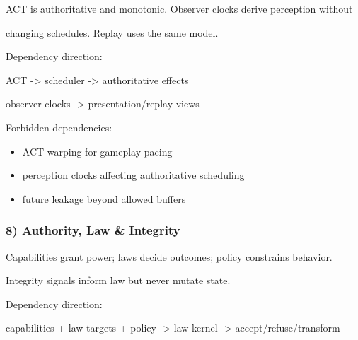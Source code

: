 \documentclass[9pt,a4paper,openany]{book}
\begin{document}
ACT is authoritative and monotonic.\allowbreak{} Observer clocks derive perception without



changing schedules.\allowbreak{} Replay uses the same model.\allowbreak{}






Dependency direction:



ACT -\allowbreak{}> scheduler -\allowbreak{}> authoritative effects



observer clocks -\allowbreak{}> presentation/\allowbreak{}replay views






Forbidden dependencies:



\begin{itemize}
\item ACT warping for gameplay pacing
\end{itemize}


\begin{itemize}
\item perception clocks affecting authoritative scheduling
\end{itemize}


\begin{itemize}
\item future leakage beyond allowed buffers
\end{itemize}





\subsubsection{8) Authority, Law \& Integrity}


Capabilities grant power; laws decide outcomes; policy constrains behavior.\allowbreak{}



Integrity signals inform law but never mutate state.\allowbreak{}






Dependency direction:



capabilities + law targets + policy -\allowbreak{}> law kernel -\allowbreak{}> accept/\allowbreak{}refuse/\allowbreak{}transform
\end{document}
